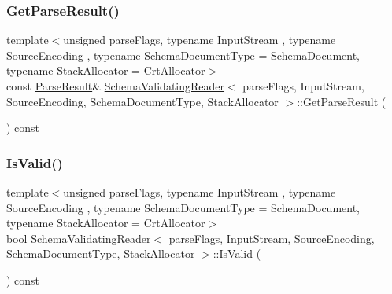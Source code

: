 \mbox{\label{classSchemaValidatingReader_add1def2be62e1443a88c7792e5b34e3b}} 
\subsubsection{\texorpdfstring{Get\+Parse\+Result()}{GetParseResult()}}
{\footnotesize\ttfamily template$<$unsigned parse\+Flags, typename Input\+Stream , typename Source\+Encoding , typename Schema\+Document\+Type  = Schema\+Document, typename Stack\+Allocator  = Crt\+Allocator$>$ \\
const \hyperlink{structParseResult}{Parse\+Result}\& \hyperlink{classSchemaValidatingReader}{Schema\+Validating\+Reader}$<$ parse\+Flags, Input\+Stream, Source\+Encoding, Schema\+Document\+Type, Stack\+Allocator $>$\+::Get\+Parse\+Result (\begin{DoxyParamCaption}{ }\end{DoxyParamCaption}) const\hspace{0.3cm}{\ttfamily [inline]}}

\mbox{\label{classSchemaValidatingReader_a3c04fa90a430a67a993a2b8876e89ff4}} 
\subsubsection{\texorpdfstring{Is\+Valid()}{IsValid()}}
{\footnotesize\ttfamily template$<$unsigned parse\+Flags, typename Input\+Stream , typename Source\+Encoding , typename Schema\+Document\+Type  = Schema\+Document, typename Stack\+Allocator  = Crt\+Allocator$>$ \\
bool \hyperlink{classSchemaValidatingReader}{Schema\+Validating\+Reader}$<$ parse\+Flags, Input\+Stream, Source\+Encoding, Schema\+Document\+Type, Stack\+Allocator $>$\+::Is\+Valid (\begin{DoxyParamCaption}{ }\end{DoxyParamCaption}) const\hspace{0.3cm}{\ttfamily [inline]}}

\mbox{\label{classSchemaValidatingReader_a7135d8d53aacd850fbce2901cca4a4c3}} 
